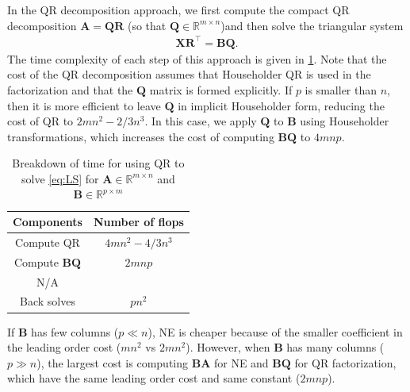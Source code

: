 \documentclass{article}
\newcommand{\mat}[1]{\mathbf{#1}}
\begin{document}
In the QR decomposition approach, we first compute the compact QR decomposition $\mat{A} = \mat{Q}\mat{R}$ (so that $\mat{Q}\in \mathbb{R}^{m \times n}$)and then solve the  triangular system
\begin{align}
\label{eq:QR}  
\mat{X} \mat{R}^\top = \mat{B}\mat{Q}.
\end{align}
The time complexity of each step of this approach is given in \cref{tab:QR-time}.
Note that the cost of the QR decomposition assumes that Householder QR is used in the factorization and that the $\mat{Q}$ matrix is formed explicitly.
If $p$ is smaller than $n$, then it is more efficient to leave $\mat{Q}$ in implicit Householder form, reducing the cost of QR to $2mn^2-2/3n^3$.
In this case, we apply $\mat{Q}$ to $\mat{B}$ using Householder transformations, which increases the cost of computing $\mat{B}\mat{Q}$ to $4mnp$. 

\begin{table}[!ht]
  \centering
  \begin{tabular}{|c|c|}
    \hline
    Components & Number of flops\\
    \hline
    Compute QR & $4mn^2 - 4/3n^3$ \\
    Compute $\mat{B}\mat{Q}$ & $2mnp$\\
    N/A & \\
    Back solves & $pn^2$ \\
    \hline
  \end{tabular}
  \caption{Breakdown of time for using QR to solve \cref{eq:LS} for $\mat{A} \in \mathbb{R}^{m \times n}$ and $\mat{B} \in \mathbb{R}^{p \times m}$}
  \label{tab:QR-time}
\end{table}

If $\mat{B}$ has few columns ($p\ll n$), NE is cheaper because of the smaller coefficient in the leading order cost ($mn^2$ vs $2mn^2$). 
However, when $\mat{B}$ has many columns ($p\gg n$), the largest cost is computing $\mat{B}\mat{A}$ for NE and $\mat{B}\mat{Q}$ for QR factorization, which have the same leading order cost and same constant ($2mnp$).
\end{document}
